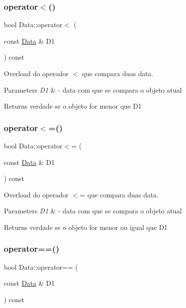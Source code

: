 \subsubsection{\texorpdfstring{operator$<$()}{operator<()}}
{\footnotesize\ttfamily bool Data\+::operator$<$ (\begin{DoxyParamCaption}\item[{const \mbox{\hyperlink{class_data}{Data}} \&}]{D1 }\end{DoxyParamCaption}) const}



Overload do operador $<$ que compara duas data. 


\begin{DoxyParams}{Parameters}
{\em D1} & -\/ data com que se compara o objeto atual \\
\hline
\end{DoxyParams}
\begin{DoxyReturn}{Returns}
verdade se o objeto for menor que D1 
\end{DoxyReturn}
\mbox{\label{class_data_a8c3fdab05b3e81bb7b302b1d4d9a9d1f}} 
\subsubsection{\texorpdfstring{operator$<$=()}{operator<=()}}
{\footnotesize\ttfamily bool Data\+::operator$<$= (\begin{DoxyParamCaption}\item[{const \mbox{\hyperlink{class_data}{Data}} \&}]{D1 }\end{DoxyParamCaption}) const}



Overload do operador $<$= que compara duas data. 


\begin{DoxyParams}{Parameters}
{\em D1} & -\/ data com que se compara o objeto atual \\
\hline
\end{DoxyParams}
\begin{DoxyReturn}{Returns}
verdade se o objeto for menor ou igual que D1 
\end{DoxyReturn}
\mbox{\label{class_data_af00bf4efbd3504689f6bc7283378ba5f}} 
\subsubsection{\texorpdfstring{operator==()}{operator==()}}
{\footnotesize\ttfamily bool Data\+::operator== (\begin{DoxyParamCaption}\item[{const \mbox{\hyperlink{class_data}{Data}} \&}]{D1 }\end{DoxyParamCaption}) const}




